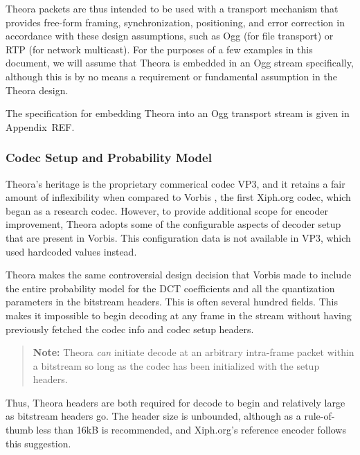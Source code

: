 \documentclass[11pt,letterpaper]{article}
\begin{document}
Theora packets are thus intended to be used with a transport mechanism that
 provides free-form framing, synchronization, positioning, and error correction
 in accordance with these design assumptions, such as Ogg (for file transport)
 or RTP (for network multicast).
For the purposes of a few examples in this document, we will assume that Theora
 is embedded in an Ogg stream specifically, although this is by no means a
 requirement or fundamental assumption in the Theora design.

The specification for embedding Theora into an Ogg transport stream is given in
 Appendix~REF.

\subsubsection{Codec Setup and Probability Model}

Theora's heritage is the proprietary commerical codec VP3, and it retains a
 fair amount of inflexibility when compared to Vorbis \cite{vorbis}, the first
 Xiph.org codec, which began as a research codec.
However, to provide additional scope for encoder improvement, Theora adopts
 some of the configurable aspects of decoder setup that are present in Vorbis.
This configuration data is not available in VP3, which used hardcoded values
 instead.

Theora makes the same controversial design decision that Vorbis made to include
 the entire probability model for the DCT coefficients and all the quantization
 parameters in the bitstream headers.
This is often several hundred fields.
This makes it impossible to begin decoding at any frame in the stream without
 having previously fetched the codec info and codec setup headers.

\begin{verse}
{\bf Note:} Theora {\em can} initiate decode at an arbitrary intra-frame packet
 within a bitstream so long as the codec has been initialized with the setup
 headers.
\end{verse}

Thus, Theora headers are both required for decode to begin and relatively large
 as bitstream headers go.
The header size is unbounded, although as a rule-of-thumb less than 16kB is
 recommended, and Xiph.org's reference encoder follows this suggestion.
\end{document}
